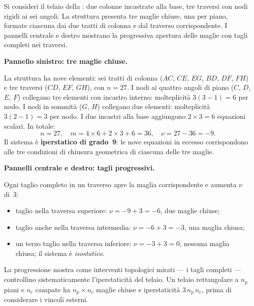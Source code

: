 \begin{esempio}
	\label{ex:telaio_pluriconnesso}
	Si consideri il telaio della
	: due colonne
	incastrate alla base, tre traversi con nodi rigidi
	ai sei angoli. La struttura presenta tre maglie
	chiuse, una per piano, formate ciascuna dai due
	tratti di colonna e dal traverso corrispondente.
	I pannelli centrale e destro mostrano la progressiva
	apertura delle maglie con tagli completi nei traversi.
	


	
	\textbf{Pannello sinistro: tre maglie chiuse.}
	\begin{svolgimento}
		La struttura ha nove elementi: sei tratti di
		colonna ($AC$, $CE$, $EG$, $BD$, $DF$, $FH$)
		e tre traversi ($CD$, $EF$, $GH$), con $n = 27$.
		I nodi ai quattro angoli di piano ($C$, $D$,
		$E$, $F$) collegano tre elementi con incastro
		interno: molteplicità $3(3-1) = 6$ per nodo.
		I nodi in sommità ($G$, $H$) collegano due
		elementi: molteplicità $3(2-1) = 3$ per nodo.
		I due incastri alla base aggiungono $2 \times 3 = 6$
		equazioni scalari. In totale:
		\[
		n = 27, \quad
		m = 4 \times 6 + 2 \times 3 + 6 = 36,
		\quad \nu = 27 - 36 = -9.
		\]
		Il sistema è \textbf{iperstatico di grado~9}:
		le nove equazioni in eccesso corrispondono alle
		tre condizioni di chiusura geometrica di ciascuna
		delle tre maglie.
	\end{svolgimento}
	
	\textbf{Pannelli centrale e destro: tagli progressivi.}
	\begin{svolgimento}
		Ogni taglio completo in un traverso apre la
		maglia corrispondente e aumenta $\nu$ di~3:
		\begin{itemize}[nosep]
			\item taglio nella traversa superiore:
			$\nu = -9 + 3 = -6$, due maglie chiuse;
			\item taglio anche nella traversa intermedia:
			$\nu = -6 + 3 = -3$, una maglia chiusa;
			\item un terzo taglio nella traversa inferiore:
			$\nu = -3 + 3 = 0$, nessuna maglia chiusa;
			il sistema è \textit{isostatico}.
		\end{itemize}
	\end{svolgimento}
	
	\begin{oss}
		La progressione mostra come interventi topologici
		mirati --- i tagli completi --- controllino
		sistematicamente l'iperstaticità del telaio.
		Un telaio rettangolare a $n_p$ piani e $n_c$
		campate ha $n_p \times n_c$ maglie chiuse e
		iperstaticità $3\,n_p\,n_c$, prima di considerare
		i vincoli esterni.
	\end{oss}
\end{esempio}




